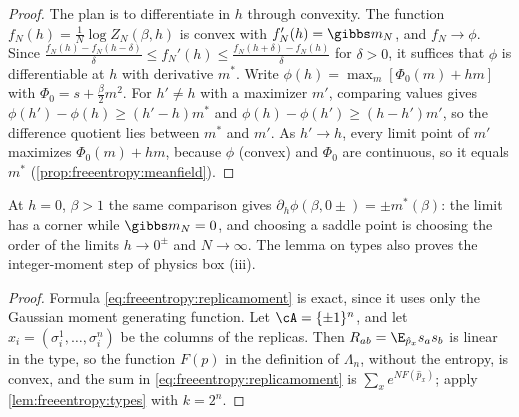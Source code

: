 \begin{refsection}

\begin{proof}
The plan is to differentiate in $h$ through convexity. The function $f_N(h)=\frac1N\log Z_N(\beta,h)$ is convex with $f_N'(h)=\gibbs m_N$, and $f_N\to\phi$. Since $\frac{f_N(h)-f_N(h-\delta)}\delta\le f_N'(h)\le\frac{f_N(h+\delta)-f_N(h)}\delta$ for $\delta>0$, it suffices that $\phi$ is differentiable at $h$ with derivative $m^*$. Write $\phi(h)=\max_m[\Phi_0(m)+hm]$ with $\Phi_0=s+\frac\beta2m^2$. For $h'\ne h$ with a maximizer $m'$, comparing values gives $\phi(h')-\phi(h)\ge(h'-h)m^*$ and $\phi(h)-\phi(h')\ge(h-h')m'$, so the difference quotient lies between $m^*$ and $m'$. As $h'\to h$, every limit point of $m'$ maximizes $\Phi_0(m)+hm$, because $\phi$ (convex) and $\Phi_0$ are continuous, so it equals $m^*$ (\cref{prop:freeentropy:meanfield}).
\end{proof}

At $h=0$, $\beta>1$ the same comparison gives $\partial_h\phi(\beta,0\pm)=\pm m^*(\beta)$: the limit has a corner while $\gibbs m_N=0$, and choosing a saddle point is choosing the order of the limits $h\to0^\pm$ and $N\to\infty$. The lemma on types also proves the integer-moment step of physics box (iii).


\begin{proof}
Formula \eqref{eq:freeentropy:replicamoment} is exact, since it uses only the Gaussian moment generating function. Let $\cA=\{\pm1\}^n$, and let $x_i=(\sigma^1_i,\dots,\sigma^n_i)$ be the columns of the replicas. Then $R_{ab}=\E_{\hat p_x}s_as_b$ is linear in the type, so the function $F(p)$ in the definition of $\Lambda_n$, without the entropy, is convex, and the sum in \eqref{eq:freeentropy:replicamoment} is $\sum_xe^{NF(\hat p_x)}$; apply \cref{lem:freeentropy:types} with $k=2^n$.
\end{proof}


\end{refsection}
